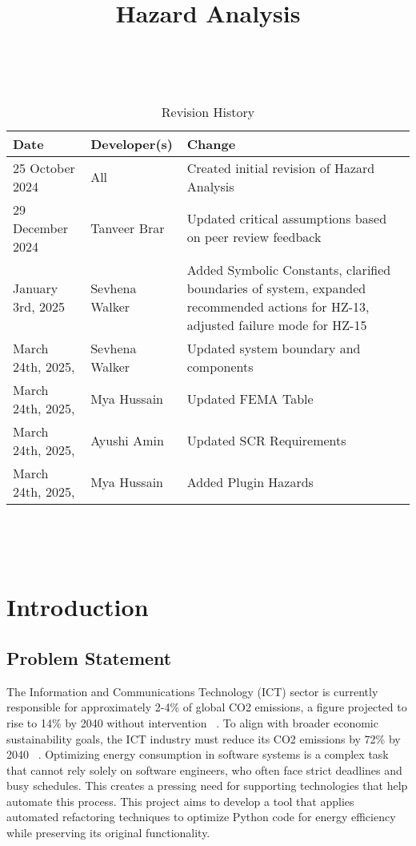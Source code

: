 \documentclass{article}
\title{Hazard Analysis\\\progname}
\author{\authname}
\date{}
\begin{document}
\maketitle
\thispagestyle{empty}

~\newpage


\begin{table}[hp]
\caption{Revision History} \label{TblRevisionHistory}
\begin{tabularx}{\textwidth}{ll>{\raggedright\arraybackslash}X}
\toprule
\textbf{Date} & \textbf{Developer(s)} & \textbf{Change}\\
\midrule
25 October 2024 & All & Created initial revision of Hazard Analysis\\
29 December 2024 & Tanveer Brar & Updated critical assumptions based on peer review feedback\\
January 3rd, 2025 & Sevhena Walker & Added Symbolic Constants, clarified boundaries of system, expanded recommended actions for HZ-13, adjusted failure mode for HZ-15 \\
March 24th, 2025, & Sevhena Walker & Updated system boundary and components\\
March 24th, 2025, & Mya Hussain & Updated FEMA Table\\
March 24th, 2025, & Ayushi Amin & Updated SCR Requirements\\
March 24th, 2025, & Mya Hussain & Added Plugin Hazards\\
\bottomrule
\end{tabularx}
\end{table}

~\newpage

\tableofcontents

~\newpage




\section{Introduction}

\subsection{Problem Statement}
The Information and Communications Technology (ICT) sector is currently responsible
for approximately 2-4\% of global CO2 emissions, a figure projected to rise to 14\% 
by 2040 without intervention ~\citep{BelkhirAndElmeligi2018}. To align with broader 
economic sustainability goals, the ICT industry must reduce its CO2 emissions by 72\% 
by 2040 ~\citep{FreitagAndBernersLee2021}. Optimizing energy consumption in software 
systems is a complex task that cannot rely solely on software engineers, who often 
face strict deadlines and busy schedules. This creates a pressing need for supporting 
technologies that help automate this process. This project aims to develop a tool that 
applies automated refactoring techniques to optimize Python code for energy efficiency 
while preserving its original functionality. 
\end{document}
